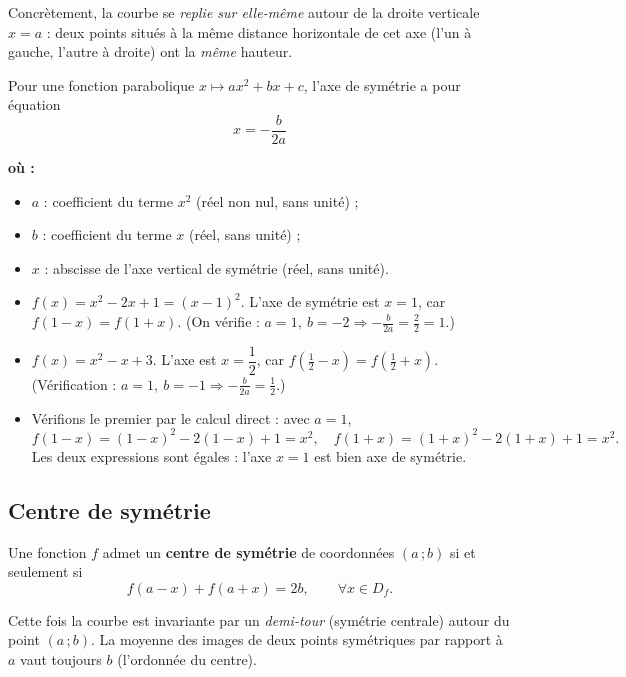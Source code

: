 \documentclass[11pt,a4paper]{article}
\newenvironment{ou}{%
  \par\smallskip\noindent\textbf{où :}\nopagebreak
  \begin{itemize}[leftmargin=1.8em,topsep=2pt,itemsep=1.5pt,parsep=0pt]}%
  {\end{itemize}}
\newcommand{\Df}{D_f}
\begin{document}
Concrètement, la courbe se \emph{replie sur elle-même} autour de la droite verticale
$x=a$ : deux points situés à la même distance horizontale de cet axe (l'un à gauche,
l'autre à droite) ont la \emph{même} hauteur.

\begin{formule}
Pour une fonction parabolique $x\mapsto ax^2+bx+c$, l'axe de symétrie a pour équation
\[
  \boxed{\,x=-\dfrac{b}{2a}\,}
\]
\begin{ou}
  \item $a$ : coefficient du terme $x^2$ (réel non nul, sans unité) ;
  \item $b$ : coefficient du terme $x$ (réel, sans unité) ;
  \item $x$ : abscisse de l'axe vertical de symétrie (réel, sans unité).
\end{ou}
\end{formule}

\begin{exemple}
\begin{itemize}[leftmargin=1.5em,topsep=2pt]
  \item $f(x)=x^2-2x+1=(x-1)^2$. L'axe de symétrie est $x=1$, car
        $f(1-x)=f(1+x)$. (On vérifie : $a=1,\ b=-2 \Rightarrow -\frac{b}{2a}=\frac{2}{2}=1$.)
  \item $f(x)=x^2-x+3$. L'axe est $x=\dfrac12$, car $f\!\left(\tfrac12-x\right)=f\!\left(\tfrac12+x\right)$.
        (Vérification : $a=1,\ b=-1\Rightarrow -\frac{b}{2a}=\frac12$.)
  \item Vérifions le premier par le calcul direct : avec $a=1$,
        \[ f(1-x)=(1-x)^2-2(1-x)+1 = x^2,\quad f(1+x)=(1+x)^2-2(1+x)+1 = x^2. \]
        Les deux expressions sont égales : l'axe $x=1$ est bien axe de symétrie.
\end{itemize}
\end{exemple}

\subsection{Centre de symétrie}

\begin{definition}
Une fonction $f$ admet un \textbf{centre de symétrie} de coordonnées $(a\,;b)$ si et
seulement si
\[
  f(a-x)+f(a+x)=2b,\qquad \forall x\in\Df .
\]
\end{definition}

Cette fois la courbe est invariante par un \emph{demi-tour} (symétrie centrale) autour
du point $(a\,;b)$. La moyenne des images de deux points symétriques par rapport à $a$
vaut toujours $b$ (l'ordonnée du centre).
\end{document}
